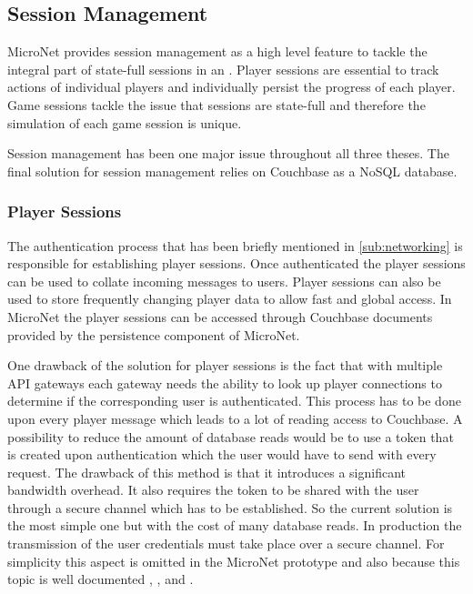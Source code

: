 \subsection{Session Management}
\label{sub:session_management}

MicroNet provides session management as a high level feature to tackle the
integral part of state-full sessions in an \og{}. Player sessions are
essential to track actions of individual players and individually persist the
progress of each player. Game sessions tackle the issue that \og{} sessions are
state-full and therefore the simulation of each game session is unique.

Session management has been one major issue throughout all three theses. The
final solution for session management relies on Couchbase as a NoSQL database.

\subsubsection{Player Sessions}

The authentication process that has been briefly mentioned in
\autoref{sub:networking} is responsible for establishing player sessions. Once
authenticated the player sessions can be used to collate incoming messages to
users. Player sessions can also be used to store frequently changing player data
to allow fast and global access. In MicroNet the player sessions can be accessed
through Couchbase documents provided by the persistence component of MicroNet.

One drawback of the solution for player sessions is the fact that with multiple
API gateways each gateway needs the ability to look up player connections to
determine if the corresponding user is authenticated. This process has to be
done upon every player message which leads to a lot of reading access to
Couchbase. A possibility to reduce the amount of database reads would be to use
a token that is created upon authentication which the user would have to send
with every request. The drawback of this method is that it introduces a
significant bandwidth overhead. It also requires the token to be shared with the
user through a secure channel which has to be established. So the current
solution is the most simple one but with the cost of many database reads. In
production the transmission of the user credentials must take place over a
secure channel. For simplicity this aspect is omitted in the MicroNet prototype
and also because this topic is well documented \cite{sun2015security},
\cite{shieh2015methods}, and \cite{thanh2016embedding}.


